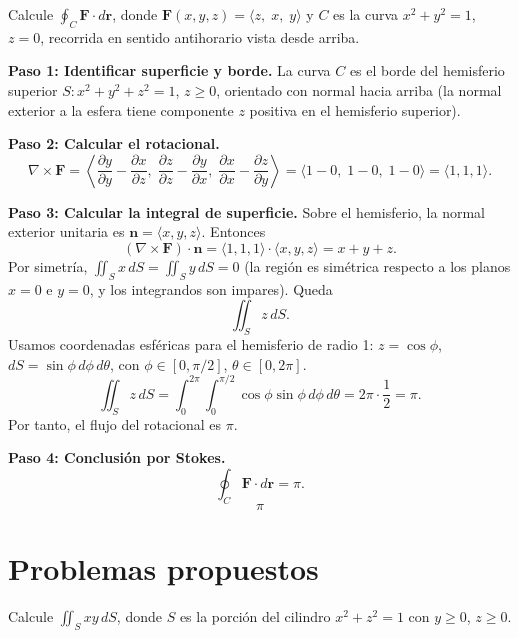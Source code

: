 \begin{example}
Calcule $\displaystyle \oint_C \mathbf{F}\cdot d\mathbf{r}$, donde $\mathbf{F}(x,y,z)=\langle z,\; x,\; y\rangle$ y $C$ es la curva $x^2+y^2=1$, $z=0$, recorrida en sentido antihorario vista desde arriba.
\begin{myproof}
\textbf{Paso 1: Identificar superficie y borde.}
La curva $C$ es el borde del hemisferio superior $S: x^2+y^2+z^2=1$, $z\ge 0$, orientado con normal hacia arriba (la normal exterior a la esfera tiene componente $z$ positiva en el hemisferio superior).

\textbf{Paso 2: Calcular el rotacional.}
\[
\nabla\times\mathbf{F}
=
\left\langle
\frac{\partial y}{\partial y}-\frac{\partial x}{\partial z},\;
\frac{\partial z}{\partial z}-\frac{\partial y}{\partial x},\;
\frac{\partial x}{\partial x}-\frac{\partial z}{\partial y}
\right\rangle
=
\langle 1-0,\;1-0,\;1-0\rangle
=
\langle 1,1,1\rangle.
\]

\textbf{Paso 3: Calcular la integral de superficie.}
Sobre el hemisferio, la normal exterior unitaria es $\mathbf{n}=\langle x,y,z\rangle$. Entonces
\[
(\nabla\times\mathbf{F})\cdot\mathbf{n} = \langle 1,1,1\rangle\cdot\langle x,y,z\rangle = x+y+z.
\]
Por simetría, $\iint_S x\,dS = \iint_S y\,dS = 0$ (la región es simétrica respecto a los planos $x=0$ e $y=0$, y los integrandos son impares). Queda
\[
\iint_S z\,dS.
\]
Usamos coordenadas esféricas para el hemisferio de radio 1: $z=\cos\phi$, $dS=\sin\phi\,d\phi\,d\theta$, con $\phi\in[0,\pi/2]$, $\theta\in[0,2\pi]$.
\[
\iint_S z\,dS
= \int_0^{2\pi}\int_0^{\pi/2} \cos\phi\sin\phi\,d\phi\,d\theta
= 2\pi \cdot \frac{1}{2} = \pi.
\]
Por tanto, el flujo del rotacional es $\pi$.

\textbf{Paso 4: Conclusión por Stokes.}
\[
\oint_C \mathbf{F}\cdot d\mathbf{r} = \pi.
\]
\[
\boxed{\pi}
\]
\end{myproof}
\end{example}

\section{Problemas propuestos}

\begin{prob}
Calcule $\displaystyle \iint_S xy\,dS$, donde $S$ es la porción del cilindro $x^2+z^2=1$ con $y\ge 0$, $z\ge 0$.
\end{prob}


